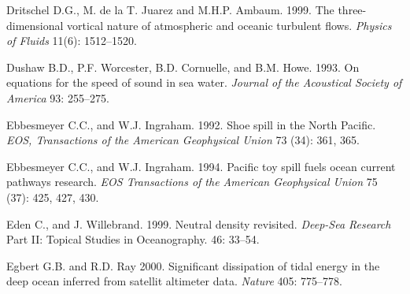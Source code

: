 \begin{thebibliography}{999}
Dritschel D.G., M. de la T. Juarez and M.H.P. Ambaum.  1999. The
three-dimensional vortical nature of atmospheric and oceanic turbulent
flows.  \textit{Physics of Fluids} 11(6): 1512--1520.
%

Dushaw B.D., P.F. Worcester, B.D. Cornuelle, and B.M. Howe. 1993. On
equations for the speed of sound in sea water.  \textit{Journal of the
  Acoustical Society of America} 93: 255--275.
%

Ebbesmeyer C.C., and W.J. Ingraham.  1992. Shoe spill in the North
Pacific. \textit{EOS, Transactions of the American Geophysical Union}
73 (34): 361, 365.
%

Ebbesmeyer C.C., and W.J. Ingraham.  1994. Pacific toy spill fuels
ocean current pathways research. \textit{EOS Transactions of the
  American Geophysical Union} 75 (37): 425, 427, 430.
%

Eden C., and J. Willebrand.  1999. Neutral density revisited.
\textit{Deep-Sea Research} Part II: Topical Studies in
Oceanography. 46: 33--54.
%

Egbert G.B. and R.D. Ray 2000. Significant dissipation of tidal energy
in the deep ocean inferred from satellit altimeter
data. \textit{Nature} 405: 775--778.
%


\end{thebibliography}
